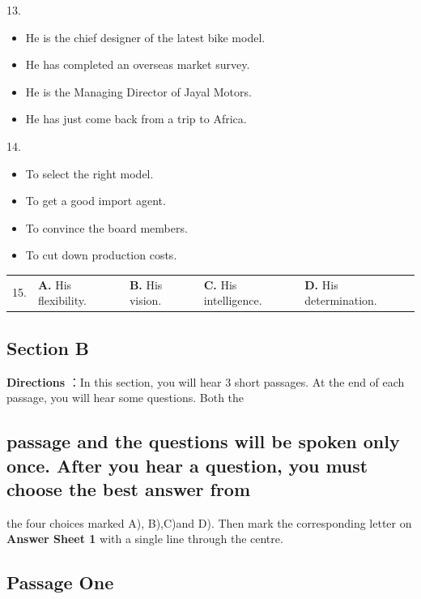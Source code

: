 \documentclass[UTF8,11pt]{ctexart}
\begin{document}
13.


\begin{itemize}[leftmargin=2em,itemsep=.2em,topsep=.4em]\item[A.] He is the chief designer of the latest bike model.
\item[B.] He has completed an overseas market survey.
\item[C.] He is the Managing Director of Jayal Motors.
\item[D.] He has just come back from a trip to Africa.
\end{itemize}

14.


\begin{itemize}[leftmargin=2em,itemsep=.2em,topsep=.4em]\item[A.] To select the right model.
\item[B.] To get a good import agent.
\item[C.] To convince the board members.
\item[D.] To cut down production costs.
\end{itemize}

\noindent\begin{tabularx}{\linewidth}{@{}lXXXX@{}}15. & \textbf{A.} His flexibility. & \textbf{B.} His vision. & \textbf{C.} His intelligence. & \textbf{D.} His determination.\\\end{tabularx}\par

\subsection*{Section B}


\textbf{Directions} ：In this section, you will hear 3 short passages. At the end of each passage, you will hear some questions. Both the


\subsection*{passage and the questions will be spoken only once. After you hear a question, you must choose the best answer from}


the four choices marked A), B),C)and D). Then mark the corresponding letter on\textbf{ Answer Sheet 1} with a single line through the centre.


\subsection*{Passage One}
\end{document}
